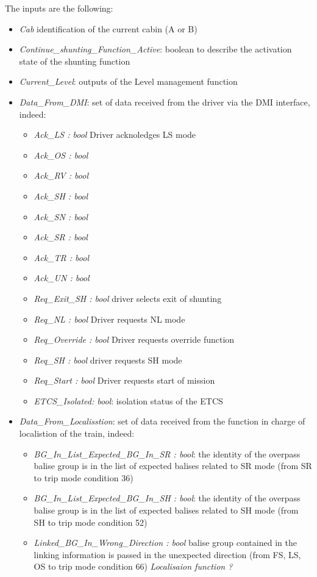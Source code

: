 The inputs are the following:
\begin{itemize}
\item \emph{Cab} identification of the current cabin (A or B)
\item \emph{Continue\_shunting\_Function\_Active}: boolean to describe the activation state of the shunting function
\item \emph{Current\_Level}: outputs of the Level management function
\item \emph{Data\_From\_DMI}: set of data received from the driver via the DMI interface, indeed:
\begin{itemize}
\item \emph{Ack\_LS : bool} Driver acknoledges LS mode
\item \emph{Ack\_OS : bool}
\item \emph{Ack\_RV : bool}
\item \emph{Ack\_SH : bool}
\item \emph{Ack\_SN : bool}
\item \emph{Ack\_SR : bool}
\item \emph{Ack\_TR : bool}
\item \emph{Ack\_UN : bool}
\item \emph{Req\_Exit\_SH : bool} driver selects exit of shunting
\item \emph{Req\_NL : bool} Driver requests NL mode
\item \emph{Req\_Override : bool} Driver requests override function
\item \emph{Req\_SH : bool} driver requests SH mode
\item \emph{Req\_Start : bool} Driver requests start of mission
\item \emph{ETCS\_Isolated: bool}: isolation status of the ETCS
\end{itemize}
\item \emph{Data\_From\_Localisstion}: set of data received from the function in charge of localistion of the train, indeed:
\begin{itemize}
\item \emph{BG\_In\_List\_Expected\_BG\_In\_SR : bool}: the identity of the overpass balise group is in the list of expected balises related to SR mode (from SR to trip mode condition 36)
\item \emph{BG\_In\_List\_Expected\_BG\_In\_SH : bool}: the identity of the overpass balise group is in the list of expected balises related to SH mode (from SH to trip mode condition 52)
\item \emph{Linked\_BG\_In\_Wrong\_Direction : bool} balise group contained in the linking information is passed in the unexpected direction (from FS, LS, OS to trip mode condition 66) \emph{Localisaion function ?}

\end{itemize}
\end{itemize}
